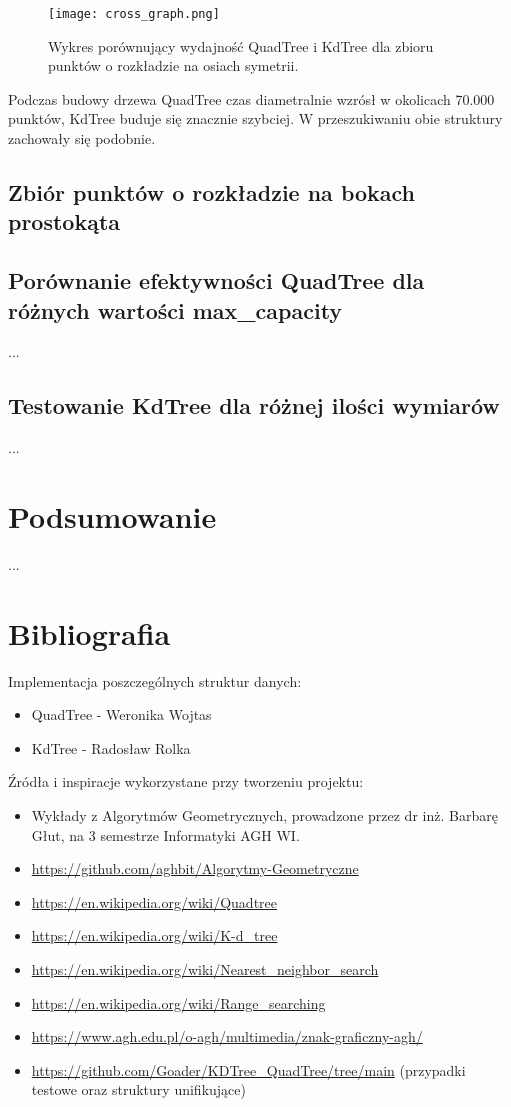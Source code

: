 \documentclass{lab}
\begin{document}
\begin{figure}[H]
  \centering
  \texttt{[image: cross\_graph.png]}
  \caption{Wykres porównujący wydajność QuadTree i KdTree dla zbioru punktów o rozkładzie na osiach symetrii.}
  \label{fig:cross_graph}
\end{figure}

Podczas budowy drzewa QuadTree czas diametralnie wzrósł w okolicach 70.000 punktów, KdTree buduje się znacznie szybciej. W przeszukiwaniu obie struktury zachowały się podobnie.

\subsection{Zbiór punktów o rozkładzie na bokach prostokąta}


\subsection{Porównanie efektywności QuadTree dla różnych wartości max\_capacity}
...

\subsection{Testowanie KdTree dla różnej ilości wymiarów}
...

\section{Podsumowanie}
...

\newpage
\section{Bibliografia}
Implementacja poszczególnych struktur danych:
\begin{itemize}
  \item QuadTree - Weronika Wojtas
  \item KdTree - Radosław Rolka
\end{itemize}

Źródła i inspiracje wykorzystane przy tworzeniu projektu:
\begin{itemize}
  \item Wykłady z Algorytmów Geometrycznych, prowadzone przez dr inż. Barbarę Głut, na 3 semestrze Informatyki AGH WI.
  \item \url{https://github.com/aghbit/Algorytmy-Geometryczne}
  \item \url{https://en.wikipedia.org/wiki/Quadtree}
  \item \url{https://en.wikipedia.org/wiki/K-d_tree}
  \item \url{https://en.wikipedia.org/wiki/Nearest_neighbor_search}
  \item \url{https://en.wikipedia.org/wiki/Range_searching}
  \item \url{https://www.agh.edu.pl/o-agh/multimedia/znak-graficzny-agh/}
  \item \url{https://github.com/Goader/KDTree_QuadTree/tree/main} (przypadki testowe oraz struktury unifikujące)
\end{itemize}
\end{document}
